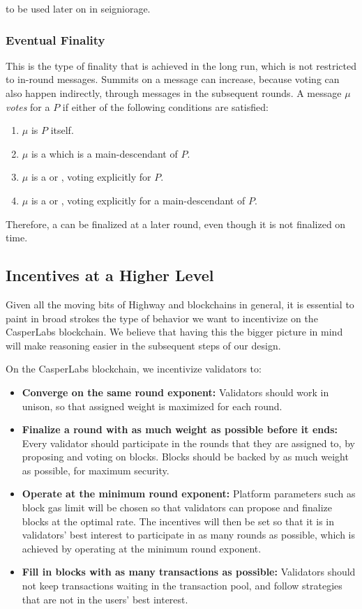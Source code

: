 to be used later on in seigniorage.

\subsubsection*{Eventual Finality}
\label{sec:eventual-finality}

This is the type of finality that is achieved in the long run, which is not restricted to in-round messages. Summits on a message can increase, because voting can also happen indirectly, through messages in the subsequent rounds. A message $\mu$ \emph{votes} for a \PROP $P$ if either of the following conditions are satisfied:

\begin{enumerate}
\def\labelenumi{\arabic{enumi}.}
\item $\mu$ is $P$ itself.
\item $\mu$ is a \PROP which is a main-descendant of $P$.
\item $\mu$ is a \CONF or \WIT, voting explicitly for $P$.
\item $\mu$ is a \CONF or \WIT, voting explicitly for a main-descendant of $P$.
\end{enumerate}

Therefore, a \PROP can be finalized at a later round, even though it is not finalized on time.

\subsection{Incentives at a Higher Level}

Given all the moving bits of Highway and blockchains in general, it is essential to paint in broad strokes the type of behavior we want to incentivize on the CasperLabs blockchain. We believe that having this the bigger picture in mind will make reasoning easier in the subsequent steps of our design.

On the CasperLabs blockchain, we incentivize validators to:

\begin{itemize}
\item \textbf{Converge on the same round exponent:} Validators should work in unison, so that assigned weight is maximized for each round.
\item \textbf{Finalize a round with as much weight as possible before it ends:} Every validator should participate in the rounds that they are assigned to, by proposing and voting on blocks. Blocks should be backed by as much weight as possible, for maximum security.
\item \textbf{Operate at the minimum round exponent:} Platform parameters such as block gas limit will be chosen so that validators can propose and finalize blocks at the optimal rate. The incentives will then be set so that it is in validators' best interest to participate in as many rounds as possible, which is achieved by operating at the minimum round exponent.
\item \textbf{Fill in blocks with as many transactions as possible:} Validators should not keep transactions waiting in the transaction pool, and follow strategies that are not in the users' best interest.
\end{itemize}

